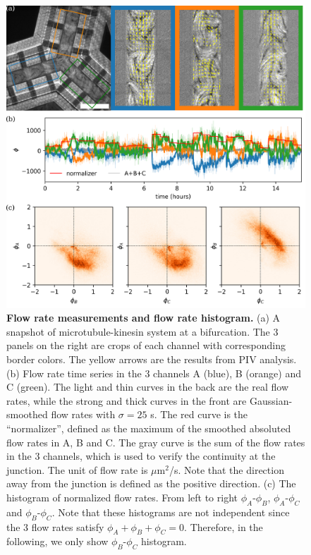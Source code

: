 \documentclass[%
10pt,
superscriptaddress,
twocolumn,
 amsmath,amssymb,
 aps,prx,
]{revtex4-2}
\begin{document}
\begin{figure}[!h]
    \includegraphics[width=\textwidth]{3-bifurcation-symmetric}
    \caption{
    \textbf{Flow rate measurements and flow rate histogram.}
    (a) A snapshot of microtubule-kinesin system at a bifurcation.
    The 3 panels on the right are crops of each channel with corresponding border colors. 
    The yellow arrows are the results from PIV analysis. 
    (b) Flow rate time series in the 3 channels A (blue), B (orange) and C (green). 
    The light and thin curves in the back are the real flow rates, while the strong and thick curves in the front are Gaussian-smoothed flow rates with $\sigma=25$ s. 
    The red curve is the ``normalizer'', defined as the maximum of the   smoothed absoluted flow rates in A, B and C. 
    The gray curve is the sum of the flow rates in the 3 channels, which is used to verify the continuity at the junction.
    The unit of flow rate is $\mu$m$^2$/s.
    Note that the direction away from the junction is defined as the positive direction. 
    (c) The histogram of normalized flow rates. From left to right $\phi_A$-$\phi_B$, $\phi_A$-$\phi_C$ and $\phi_B$-$\phi_C$. Note that these histograms are not independent since the 3 flow rates satisfy $\phi_A+\phi_B+\phi_C = 0$. Therefore, in the following, we only show $\phi_B$-$\phi_C$ histogram.
    }
    \label{fig:bifurcation-symmetric}
\end{figure}
\end{document}
